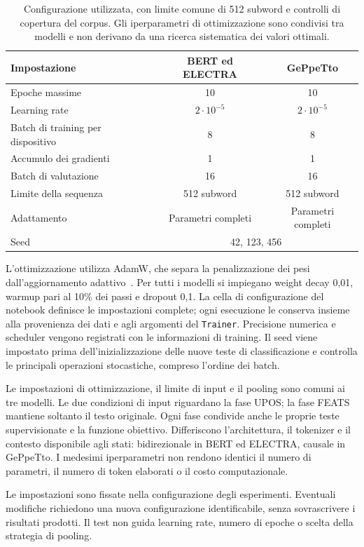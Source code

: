 \documentclass[12pt,a4paper]{report}
\begin{document}
\begin{table}[!htbp]
\centering\small
\begin{tabularx}{\textwidth}{Xcc}
\toprule
Impostazione & BERT ed ELECTRA & GePpeTto\\
\midrule
Epoche massime & 10 & 10\\
Learning rate & $2\cdot10^{-5}$ & $2\cdot10^{-5}$\\
Batch di training per dispositivo & 8 & 8\\
Accumulo dei gradienti & 1 & 1\\
Batch di valutazione & 16 & 16\\
Limite della sequenza & 512 subword & 512 subword\\
Adattamento & Parametri completi & Parametri completi\\
Seed & \multicolumn{2}{c}{42, 123, 456}\\
\bottomrule
\end{tabularx}
\caption{Configurazione utilizzata, con limite comune di 512 subword e controlli di copertura del corpus. Gli iperparametri di ottimizzazione sono condivisi tra modelli e non derivano da una ricerca sistematica dei valori ottimali.}
\label{tab:training}
\end{table}

L'ottimizzazione utilizza AdamW, che separa la penalizzazione dei pesi dall'aggiornamento adattivo~\cite{adamw2019}. Per tutti i modelli si impiegano weight decay 0,01, warmup pari al 10\% dei passi e dropout 0,1. La cella di configurazione del notebook definisce le impostazioni complete; ogni esecuzione le conserva insieme alla provenienza dei dati e agli argomenti del \texttt{Trainer}. Precisione numerica e scheduler vengono registrati con le informazioni di training. Il seed viene impostato prima dell'inizializzazione delle nuove teste di classificazione e controlla le principali operazioni stocastiche, compreso l'ordine dei batch.

Le impostazioni di ottimizzazione, il limite di input e il pooling sono comuni ai tre modelli. Le due condizioni di input riguardano la fase UPOS; la fase FEATS mantiene soltanto il testo originale. Ogni fase condivide anche le proprie teste supervisionate e la funzione obiettivo. Differiscono l'architettura, il tokenizer e il contesto disponibile agli stati: bidirezionale in BERT ed ELECTRA, causale in GePpeTto. I medesimi iperparametri non rendono identici il numero di parametri, il numero di token elaborati o il costo computazionale.

Le impostazioni sono fissate nella configurazione degli esperimenti. Eventuali modifiche richiedono una nuova configurazione identificabile, senza sovrascrivere i risultati prodotti. Il test non guida learning rate, numero di epoche o scelta della strategia di pooling.
\end{document}
